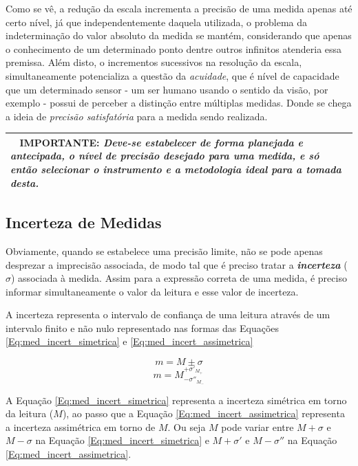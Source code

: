 \documentclass[a4paper, 11pt]{report}
\newenvironment{myboxed}
    {
        \begin{center}
        \begin{tabular}{p{0.7\textwidth}}
        \hline\
    }
    { 
        \\\hline
        \end{tabular} 
        \end{center}
    }
\begin{document}
Como se vê, a redução da escala incrementa a precisão de uma medida apenas até
certo nível, já que independentemente daquela utilizada, o problema da 
indeterminação do valor absoluto da medida se mantém, considerando que apenas
o conhecimento de um determinado ponto dentre outros infinitos atenderia essa 
premissa. Além disto, o incrementos sucessivos na resolução da escala, 
simultaneamente potencializa a questão da \emph{acuidade}, que é nível de 
capacidade que um determinado sensor - um ser humano usando o sentido da visão, 
por exemplo - possui de perceber a distinção entre múltiplas medidas. Donde se
chega a ideia de \emph{precisão satisfatória} para a medida sendo realizada. 
\newline 
\begin{myboxed}
    \textbf{IMPORTANTE:}
    \emph{
        Deve-se estabelecer de forma planejada e antecipada, o nível de precisão 
        desejado para uma medida, e só então selecionar o instrumento e 
        a metodologia ideal para a tomada desta.
    }
\end{myboxed}

\subsection{Incerteza de Medidas}
Obviamente, quando se estabelece uma precisão limite, não se pode apenas
desprezar a imprecisão associada, de modo tal que é preciso tratar a 
\textbf{\emph{incerteza}} ($\sigma$) associada à medida. Assim para a expressão 
correta de uma medida, é preciso informar simultaneamente o valor da leitura e 
esse valor de incerteza. 

A incerteza representa o intervalo de confiança de uma leitura através de um 
intervalo finito e não nulo representado nas formas das Equações 
\ref{Eq:med_incert_simetrica} e \ref{Eq:med_incert_assimetrica}

\begin{equation}
    m = M \pm \sigma
    \label{Eq:med_incert_simetrica}
\end{equation}
\begin{equation}
    m = M^{+\sigma'_{M_+}}_{-\sigma''_{M_-}}
    \label{Eq:med_incert_assimetrica}
\end{equation}

A Equação \ref{Eq:med_incert_simetrica} representa a incerteza simétrica em 
torno da leitura ($M$), ao passo que a Equação \ref{Eq:med_incert_assimetrica}
representa a incerteza assimétrica em torno de $M$. Ou seja $M$ pode variar 
entre $M + \sigma$ e $M - \sigma$ na Equação \ref{Eq:med_incert_simetrica} e 
$M + \sigma'$ e $M - \sigma''$ na Equação \ref{Eq:med_incert_assimetrica}.
\end{document}
